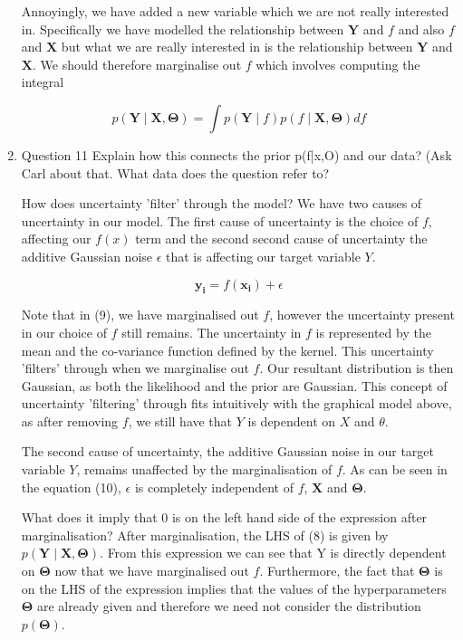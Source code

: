 \documentclass[13pt]{article}
\begin{document}
\begin{enumerate}
  Annoyingly, we have added a new variable which we are not really interested in. Specifically we have modelled the relationship between $\mathbf{Y}$ and $f$ and also $f$ and $\mathbf{X}$ but what we are really interested in is the relationship between $\mathbf{Y}$ and $\mathbf{X}$. We should therefore marginalise out $f$ which involves computing the integral
  
  \begin{equation}
      p(\mathbf{Y}\mid \mathbf{X},\mathbf{\Theta}) = \int p(\mathbf{Y}\mid f)p(f\mid \mathbf{X},\mathbf{\Theta})df 
  \end{equation}
  
  \item{\large Question 11}
  Explain how this connects the prior p(f|x,O) and our data? (Ask Carl about that. What data does the question refer to?
  
  How does uncertainty 'filter' through the model?
  We have two causes of uncertainty in our model. The first cause of uncertainty is the choice of $f$, affecting our $f(x)$ term and the second second cause of uncertainty the additive Gaussian noise $\epsilon$ that is affecting our target variable $Y$.
  
  \begin{equation}
      \mathbf{y_i} = f(\mathbf{x_i}) + \epsilon
  \end{equation}
  
  Note that in (9), we have marginalised out $f$, however the uncertainty present in our choice of $f$ still remains. The uncertainty in $f$ is represented by the mean and the co-variance function defined by the kernel. This uncertainty 'filters' through when we marginalise out $f$. Our resultant distribution is then Gaussian, as both the likelihood and the prior are Gaussian. This concept of uncertainty 'filtering' through fits intuitively with the graphical model above, as after removing $f$, we still have that $Y$ is dependent on $X$ and $\theta$.
  
  The second cause of uncertainty, the additive Gaussian noise in our target variable $Y$, remains unaffected by the marginalisation of $f$. As can be seen in the equation (10), $\epsilon$ is completely independent of $f$, $\mathbf{X}$ and $\mathbf{\Theta}$.
  
  What does it imply that 0 is on the left hand side of the expression after marginalisation? After marginalisation, the LHS of (8) is given by $p(\mathbf{Y}\mid \mathbf{X},\mathbf{\Theta})$. From this expression we can see that Y is directly dependent on $\mathbf{\Theta}$ now that we have marginalised out $f$. Furthermore, the fact that $\mathbf{\Theta}$ is on the LHS of the expression implies that the values of the hyperparameters $\mathbf{\Theta}$ are already given and therefore we need not consider the distribution $p(\mathbf{\Theta})$.
  

\end{enumerate}
\end{document}
